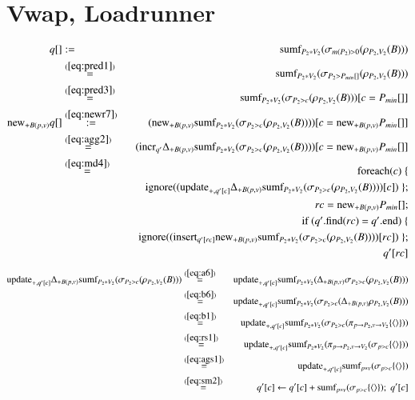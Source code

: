 \documentclass{article}
\newcommand{\tuple}[1]{{\langle#1\rangle}}
\begin{document}
\section{Vwap, Loadrunner}
\begin{eqnarray*}
q[] &:=&
\mbox{sumf}_{P_2 * V_2}(\sigma_{m(P_2) > 0} (\rho_{P_2, V_2}(B)))
\\
&\stackrel{(\ref{eq:pred1})}{=}&
\mbox{sumf}_{P_2 * V_2}(\sigma_{P_2 > P_{min}[]} (\rho_{P_2, V_2}(B)))
\\
&\stackrel{(\ref{eq:pred3})}{=}&
\mbox{sumf}_{P_2 * V_2}(\sigma_{P_2 > c} (\rho_{P_2, V_2}(B)))[c=P_{min}[]]
\\
\mathrm{new}_{+B(p,v)} q[]
&\stackrel{(\ref{eq:newr7})}{:=}&
(\mathrm{new}_{+B(p,v)}
\mbox{sumf}_{P_2 * V_2}(\sigma_{P_2 > c} (\rho_{P_2, V_2}(B))))
[c=\mathrm{new}_{+B(p,v)} P_{min}[]]
\\
&\stackrel{(\ref{eq:agg2})}{=}&
(\mathrm{incr}_{q'} \Delta_{+B(p,v)} \mbox{sumf}_{P_2 * V_2}(\sigma_{P_2 > c} (\rho_{P_2 , V_2}(B))))
[c=\mathrm{new}_{+B(p,v)} P_{min}[]]
\\
&\stackrel{(\ref{eq:md4})}{=}&\mathrm{foreach}(\mbox{$c$}) \; \{ \\
&&\quad \mathrm{ignore}((\mathrm{update}_{+, q'[c]} \Delta_{+B(p,v)} \mbox{sumf}_{P_2 * V_2}(\sigma_{P_2 > c} (\rho_{P_2 , V_2}(B))))[c]) \; \};
\\
&& rc = \mathrm{new}_{+B(p,v)} P_{min}[];
\\
&& \mbox{if ($q'$.find($rc$) = $q'$.end)}
\; \{\\
&&\quad \mathrm{ignore}((\mathrm{insert}_{q'[rc]} \mathrm{new}_{+B(p,v)} \mbox{sumf}_{P_2 * V_2}(\sigma_{P_2 > c} (\rho_{P_2 , V_2}(B))))[rc]) \; \};
\\
&& q'[rc]
\\
\end{eqnarray*}
\begin{eqnarray*}
\algupdate_{+, q'[c]} \Delta_{+B(p,v)} \algsumf_{P_2 * V_2}(\sigma_{P_2 > c} (\rho_{P_2 , V_2}(B)))
&\stackrel{(\ref{eq:a6})}{=}&
\algupdate_{+, q'[c]} \algsumf_{P_2 * V_2}(\Delta_{+B(p,v)} \sigma_{P_2 > c} (\rho_{P_2, V_2} (B)))
\\
&\stackrel{(\ref{eq:b6})}{=}&
\algupdate_{+, q'[c]} \algsumf_{P_2 * V_2}(\sigma_{P_2 > c} (\Delta_{+B(p,v)} \rho_{P_2, V_2} (B)))
\\
&\stackrel{(\ref{eq:b1})}{=}&
\algupdate_{+, q'[c]} \algsumf_{P_2 * V_2}(\sigma_{P_2 > c} (\pi_{p\rightarrow P_2, v\rightarrow V_2}\{\tuple{}\}))
\\
&\stackrel{(\ref{eq:rs1})}{=}&
\algupdate_{+, q'[c]} \algsumf_{P_2 * V_2}(\pi_{p\rightarrow P_2, v\rightarrow V_2} (\sigma_{p > c} \{\tuple{}\}))
\\
&\stackrel{(\ref{eq:ags1})}{=}&
\algupdate_{+, q'[c]} \algsumf_{p * v} (\sigma_{p > c} \{\tuple{}\})
\\
&\stackrel{(\ref{eq:sm2})}{=}&
q'[c] \leftarrow q'[c] + \algsumf_{p * v} (\sigma_{p > c} \{\tuple{}\});\; q'[c]
\\
\end{eqnarray*}
\end{document}
